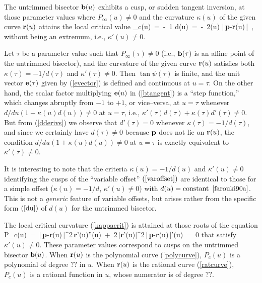 \begin{lma}
The untrimmed bisector ${\bf b}(u)$ exhibits a cusp, or sudden
tangent inversion, at those parameter values where $P_\infty(u)
\not=0$ and the curvature $\kappa(u)$ of the given curve ${\bf r}
(u)$ attains the local critical value
\be \label{kappacrit}
\kappa_c(u) \,=\, -\ {1 \over d(u)} \,=\,
-\ {2\cos\psi(u) \over |\,{\bf p}-{\bf r}(u)\,|} \,,
\ee
without being an extremum, i.e., $\kappa'(u)\not=0$.
\end{lma}

\prf Let $\tau$ be a parameter value such that $P_\infty(\tau)
\not=0$ (i.e., ${\bf b}(\tau)$ is an affine point of the untrimmed
bisector), and the curvature of the given curve ${\bf r}(u)$
satisfies both $\kappa(\tau)=-1/d(\tau)$ and $\kappa'(\tau)\not=0$.
Then $\tan\psi(\tau)$ is finite, and the unit vector ${\bf e}(\tau)$
given by (\ref{evector}) is defined and continuous at $u=\tau$.
On the other hand, the scalar factor multiplying ${\bf e}(u)$ in
(\ref{btangent}) is a ``step function,'' which changes abruptly
from $-1$ to $+1$, or vice--versa, at $u=\tau$ whenever $d/du(1+
\kappa(u)d(u))\not=0$ at $u=\tau$, i.e., $\kappa'(\tau)d(\tau)+
\kappa(\tau)d'(\tau)\not=0$. But from (\ref{dderivs}) we observe
that $d'(\tau)=0$ whenever $\kappa(\tau)=-1/d(\tau)$, and since we
certainly have $d(\tau)\not=0$ because ${\bf p}$ does not lie on
${\bf r}(u)$, the condition $d/du(1+\kappa(u)d(u))\not=0$ at $u=
\tau$ is exactly equivalent to $\kappa'(\tau)\not=0$. \QED

\begin{rmk}
{\rm
It is interesting to note that the criteria $\kappa(u)=-1/d(u)$
and $\kappa'(u)\not=0$ identifying the cusps of the ``variable
offset'' $(\ref{varoffset})$ are identical to those for a simple
offset ($\kappa(u)=-1/d$, $\kappa'(u)\not=0$) with $d(u)={\rm constant}$
$\cite{farouki90a}$. This is not a {\it generic} feature of variable
offsets, but arises rather from the specific form $(\ref{du})$ of
$d(u)$ for the untrimmed bisector.
}
\end{rmk}

The local critical curvature (\ref{kappacrit}) is attained at those
roots of the equation
\be
P_c(u) \,=\,
|\,{\bf p}-{\bf r}(u)\,|^2\,{\bf r}'(u)''(u) \,+\,
2\,|{\bf r}'(u)|^2\,[\,{\bf p}-{\bf r}(u)\,]'(u)
\,=\, 0
\ee
that satisfy $\kappa'(u)\not=0$. These parameter values correspond
to cusps on the untrimmed bisector ${\bf b}(u)$. When ${\bf r}(u)$
is the polynomial curve (\ref{polycurve}), $P_c(u)$ is a polynomial
of degree $??$ in $u$. When ${\bf r}(u)$ is the rational curve
(\ref{ratcurve}), $P_c(u)$ is a rational function in $u$, whose
numerator is of degree $??$.

